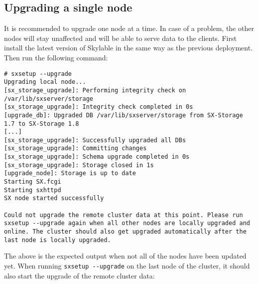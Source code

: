 \subsection{Upgrading a single node}
It is recommended to upgrade one node at a time. In case of a problem, the
other nodes will stay unaffected and will be able to serve data to the
clients.
First install the latest version of Skylable \SX in the same way as the
previous deployment. Then run the following command:
\begin{lstlisting}
# sxsetup --upgrade
Upgrading local node...
[sx_storage_upgrade]: Performing integrity check on /var/lib/sxserver/storage
[sx_storage_upgrade]: Integrity check completed in 0s
[upgrade_db]: Upgraded DB /var/lib/sxserver/storage from SX-Storage 1.7 to SX-Storage 1.8
[...]
[sx_storage_upgrade]: Successfully upgraded all DBs
[sx_storage_upgrade]: Committing changes
[sx_storage_upgrade]: Schema upgrade completed in 0s
[sx_storage_upgrade]: Storage closed in 1s
[upgrade_node]: Storage is up to date
Starting SX.fcgi
Starting sxhttpd
SX node started successfully

Could not upgrade the remote cluster data at this point. Please run
sxsetup --upgrade again when all other nodes are locally upgraded and
online. The cluster should also get upgraded automatically after the
last node is locally upgraded.
\end{lstlisting}
The above is the expected output when not all of the nodes have been
updated yet. When running \verb+sxsetup --upgrade+ on the last node
of the cluster, it should also start the upgrade of the remote cluster
data:
